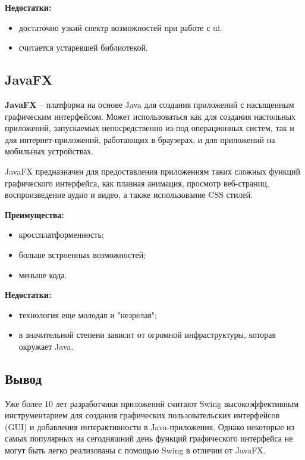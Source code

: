 \textbf{Недостатки:} 
\begin{itemize}
	\item достаточно узкий спектр возможностей при работе с ui.
    \item считается устаревшей библиотекой.
\end{itemize}


\subsection{JavaFX}

\textbf{JavaFX} -- платформа на основе Java для создания приложений с насыщенным графическим интерфейсом. Может использоваться как для создания настольных приложений, запускаемых непосредственно из-под операционных систем, так и для интернет-приложений, работающих в браузерах, и для приложений на мобильных устройствах. 

JavaFX предназначен для предоставления приложениям таких сложных функций графического интерфейса, как плавная анимация, просмотр веб-страниц, воспроизведение аудио и видео, а также использование CSS стилей.

\textbf{Преимущества:} 
\begin{itemize}
	\item кроссплатформенность;
    \item больше встроенных возможностей;
    \item меньше кода.
\end{itemize}

\textbf{Недостатки:} 
\begin{itemize}
    \item технология еще молодая и "незрелая";
    \item в значительной степени зависит от огромной инфраструктуры, которая окружает Java.
\end{itemize}



\subsection*{Вывод}

Уже более 10 лет разработчики приложений считают Swing высокоэффективным инструментарием для создания графических пользовательских интерфейсов (GUI) и добавления интерактивности в Java-приложения. Однако некоторые из самых популярных на сегодняшний день функций графического интерфейса не могут быть легко реализованы с помощью Swing в отличии от JavaFX. 


